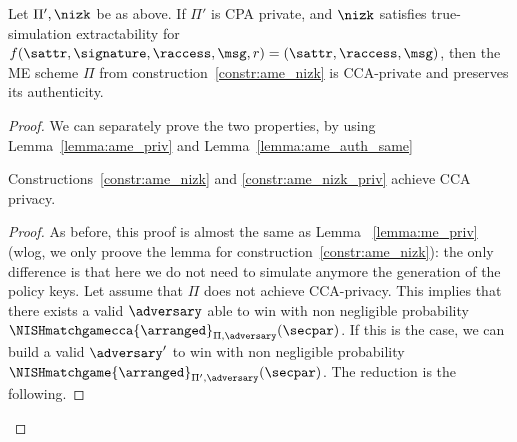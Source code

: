 \begin{theorem}\label{theo:ame_nizk_priv}
    Let $\Pi', \nizk$ be as above.
    If $\Pi'$ is CPA private, and $\nizk$ satisfies true-simulation extractability for $f(\sattr, \signature, \raccess, \msg, r) = (\sattr, \raccess, \msg)$, then the ME scheme $\Pi$ from construction~\ref{constr:ame_nizk} is CCA-private and preserves its authenticity.
\end{theorem}

\begin{proof}
    We can separately prove the two properties, by using Lemma~\ref{lemma:ame_priv} and Lemma~\ref{lemma:ame_auth_same}

    \begin{lemma}\label{lemma:ame_priv}
        Constructions~\ref{constr:ame_nizk} and \ref{constr:ame_nizk_priv} achieve CCA privacy.
        \begin{proof}
            As before, this proof is almost the same as Lemma ~\ref{lemma:me_priv} (wlog, we only proove the lemma for construction~\ref{constr:ame_nizk}): the only difference is that here we do not need to simulate anymore the generation of the policy keys.
            Let assume that $\Pi$ does not achieve CCA-privacy. This implies that there exists a valid $\adversary$ able to win with non negligible probability $\NISHmatchgamecca{\arranged}_{\Pi, \adversary}(\secpar)$. If this is the case, we can build a valid $\adversary'$ to win with non negligible probability $\NISHmatchgame{\arranged}_{\Pi', \adversary}(\secpar)$. The reduction is the following.


\end{proof}
\end{lemma}
\end{proof}
